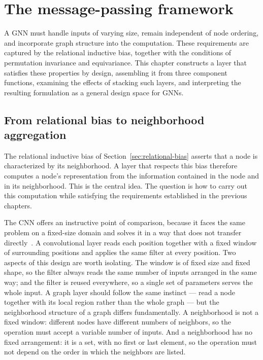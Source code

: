 \chapter{The message-passing framework}
\label{ch:message-passing}
\minitoc

A GNN must handle inputs of varying size, remain independent of 
node ordering, and incorporate graph structure into the computation. 
These requirements are captured by the relational inductive bias, together with the 
conditions of permutation invariance and equivariance. This chapter constructs 
a layer that satisfies these properties by design, assembling it from three 
component functions, examining the effects of stacking such layers, and 
interpreting the resulting formulation as a general design space for GNNs.

\section{From relational bias to neighborhood aggregation}
\label{sec:neighborhood-aggregation}

The relational inductive bias of Section~\ref{sec:relational-bias} asserts that a node 
is characterized by its neighborhood. A layer that respects this bias therefore computes 
a node's representation from the information contained in the node and in its
neighborhood. This is the central idea. The question is how to carry out this computation 
while satisfying the requirements established in the previous chapters.

The CNN offers an instructive point of comparison,
because it faces the same problem on a fixed-size domain and solves it in a way
that does not transfer directly~\cite{bishop2024}. A convolutional layer reads
each position together with a fixed window of surrounding positions and applies
the same filter at every position. Two aspects of this design are worth
isolating. The window is of fixed size and fixed shape, so the filter always
reads the same number of inputs arranged in the same way; and the filter is
reused everywhere, so a single set of parameters serves the whole input. A
graph layer should follow the same instinct --- read a node together with its
local region rather than the whole graph --- but the neighborhood structure of
a graph differs fundamentally. A neighborhood is not a fixed window: different
nodes have different numbers of neighbors, so the operation must accept a
variable number of inputs. And a neighborhood has no fixed arrangement: it is a
set, with no first or last element, so the operation must not depend on the
order in which the neighbors are listed.

